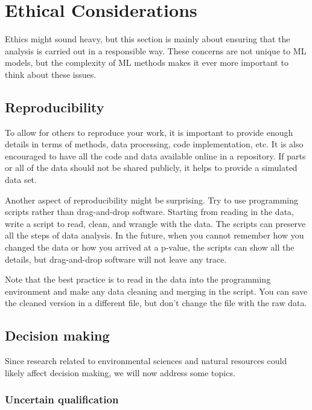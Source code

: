 \documentclass[
]{book}
\begin{document}
\hypertarget{ethical-considerations}{%
\chapter{Ethical Considerations}\label{ethical-considerations}}

Ethics might sound heavy, but this section is mainly about ensuring that the analysis is carried out in a responsible way. These concerns are not unique to ML models, but the complexity of ML methods makes it ever more important to think about these issues.

\hypertarget{reproducibility}{%
\section{Reproducibility}\label{reproducibility}}

To allow for others to reproduce your work, it is important to provide enough details in terms of methods, data processing, code implementation, etc. It is also encouraged to have all the code and data available online in a repository. If parts or all of the data should not be shared publicly, it helps to provide a simulated data set.

Another aspect of reproducibility might be surprising. Try to use programming scripts rather than drag-and-drop software. Starting from reading in the data, write a script to read, clean, and wrangle with the data. The scripts can preserve all the steps of data analysis. In the future, when you cannot remember how you changed the data or how you arrived at a p-value, the scripts can show all the details, but drag-and-drop software will not leave any trace.

Note that the best practice is to read in the data into the programming environment and make any data cleaning and merging in the script. You can save the cleaned version in a different file, but don't change the file with the raw data.

\hypertarget{decision-making}{%
\section{Decision making}\label{decision-making}}

Since research related to environmental sciences and natural resources could likely affect decision making, we will now address some topics.

\hypertarget{uncertain-qualification}{%
\subsection{Uncertain qualification}\label{uncertain-qualification}}
\end{document}
